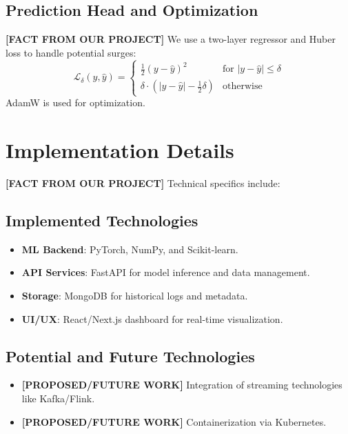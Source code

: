 \documentclass[conference]{IEEEtran}
\begin{document}
\subsection{Prediction Head and Optimization}
\noindent \textbf{[FACT FROM OUR PROJECT]} We use a two-layer regressor and Huber loss to handle potential surges:
\begin{equation}
\mathcal{L}_\delta(y, \hat{y}) = \begin{cases} 
\frac{1}{2}(y - \hat{y})^2 & \text{for } |y - \hat{y}| \le \delta \\
\delta \cdot (|y - \hat{y}| - \frac{1}{2}\delta) & \text{otherwise}
\end{cases}
\end{equation}
AdamW is used for optimization.

\section{Implementation Details}
\label{sec:implementation}

\noindent \textbf{[FACT FROM OUR PROJECT]} Technical specifics include:
\subsection{Implemented Technologies}
\begin{itemize}
    \item \textbf{ML Backend}: PyTorch, NumPy, and Scikit-learn.
    \item \textbf{API Services}: FastAPI for model inference and data management.
    \item \textbf{Storage}: MongoDB for historical logs and metadata.
    \item \textbf{UI/UX}: React/Next.js dashboard for real-time visualization.
\end{itemize}

\subsection{Potential and Future Technologies}
\begin{itemize}
    \item \textbf{[PROPOSED/FUTURE WORK]} Integration of streaming technologies like Kafka/Flink.
    \item \textbf{[PROPOSED/FUTURE WORK]} Containerization via Kubernetes.
\end{itemize}
\end{document}
